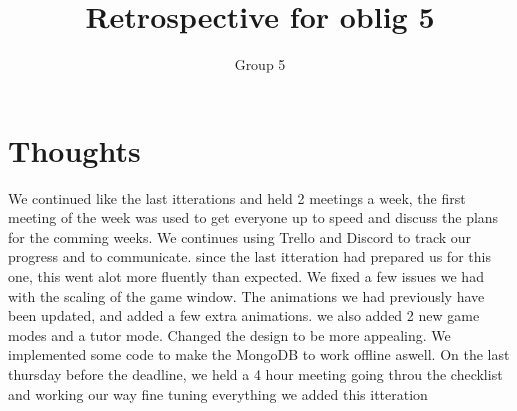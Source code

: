 \documentclass{article}
\title{Retrospective for oblig 5}
\author{Group 5}
\date{}
\begin{document}
    \maketitle

    \section{Thoughts}
    \noindent

    We continued like the last itterations and held 2 meetings a week, the first meeting of the week was used to get everyone up to speed and discuss the plans for the comming weeks.
    We continues using Trello and Discord to track our progress and to communicate. since the last itteration had prepared us for this one, this went alot more fluently than expected.
    We fixed a few issues we had with the scaling of the game window.
    The animations we had previously have been updated, and added a few extra animations. we also added 2 new game modes and a tutor mode.
    Changed the design to be more appealing. We implemented some code to make the MongoDB to work offline aswell.
    On the last thursday before the deadline, we held a 4 hour meeting going throu the checklist and working our way fine tuning everything we added
    this itteration
\end{document}
